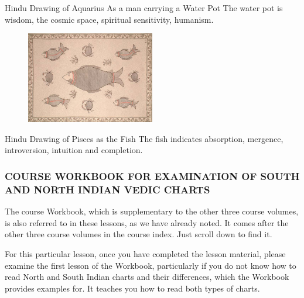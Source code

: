 Hindu Drawing of Aquarius
As a man carrying a Water Pot
The water pot is wisdom, the cosmic space, spiritual sensitivity, humanism.

 


\begin{figure}[H]
 \centering
\includegraphics[width=0.5\textwidth]{pics/Pisces.png}
 \end{figure}
 

Hindu Drawing of Pisces as the Fish
The fish indicates absorption, mergence, introversion, intuition and completion.



 

\subsubsection{COURSE WORKBOOK FOR EXAMINATION OF SOUTH AND NORTH INDIAN VEDIC CHARTS}

The course Workbook, which is supplementary to the other three course volumes, is also referred to in these lessons, as we have already noted. It comes after the other three course volumes in the course index. Just scroll down to find it.

For this particular lesson, once you have completed the lesson material, please examine the first lesson of the Workbook, particularly if you do not know how to read North and South Indian charts and their differences, which the Workbook provides examples for. It teaches you how to read both types of charts. 